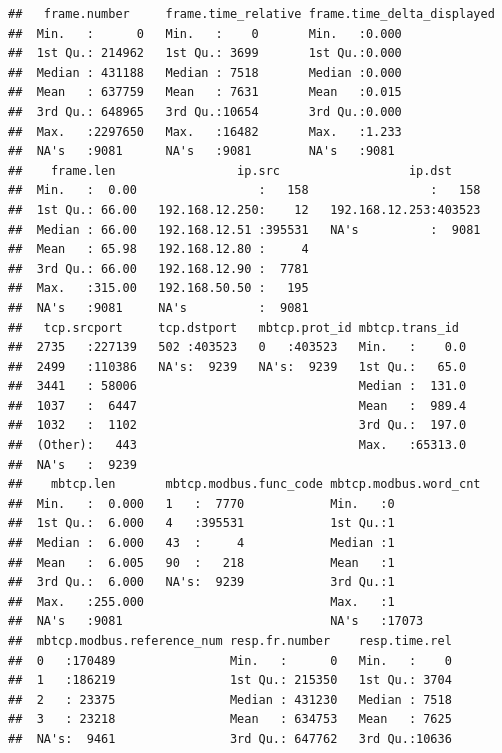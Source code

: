 \documentclass[]{article}
\begin{document}
\begin{verbatim}
##   frame.number     frame.time_relative frame.time_delta_displayed
##  Min.   :      0   Min.   :    0       Min.   :0.000             
##  1st Qu.: 214962   1st Qu.: 3699       1st Qu.:0.000             
##  Median : 431188   Median : 7518       Median :0.000             
##  Mean   : 637759   Mean   : 7631       Mean   :0.015             
##  3rd Qu.: 648965   3rd Qu.:10654       3rd Qu.:0.000             
##  Max.   :2297650   Max.   :16482       Max.   :1.233             
##  NA's   :9081      NA's   :9081        NA's   :9081              
##    frame.len                 ip.src                  ip.dst      
##  Min.   :  0.00                 :   158                 :   158  
##  1st Qu.: 66.00   192.168.12.250:    12   192.168.12.253:403523  
##  Median : 66.00   192.168.12.51 :395531   NA's          :  9081  
##  Mean   : 65.98   192.168.12.80 :     4                          
##  3rd Qu.: 66.00   192.168.12.90 :  7781                          
##  Max.   :315.00   192.168.50.50 :   195                          
##  NA's   :9081     NA's          :  9081                          
##   tcp.srcport     tcp.dstport   mbtcp.prot_id mbtcp.trans_id   
##  2735   :227139   502 :403523   0   :403523   Min.   :    0.0  
##  2499   :110386   NA's:  9239   NA's:  9239   1st Qu.:   65.0  
##  3441   : 58006                               Median :  131.0  
##  1037   :  6447                               Mean   :  989.4  
##  1032   :  1102                               3rd Qu.:  197.0  
##  (Other):   443                               Max.   :65313.0  
##  NA's   :  9239                                                
##    mbtcp.len       mbtcp.modbus.func_code mbtcp.modbus.word_cnt
##  Min.   :  0.000   1   :  7770            Min.   :0            
##  1st Qu.:  6.000   4   :395531            1st Qu.:1            
##  Median :  6.000   43  :     4            Median :1            
##  Mean   :  6.005   90  :   218            Mean   :1            
##  3rd Qu.:  6.000   NA's:  9239            3rd Qu.:1            
##  Max.   :255.000                          Max.   :1            
##  NA's   :9081                             NA's   :17073        
##  mbtcp.modbus.reference_num resp.fr.number    resp.time.rel  
##  0   :170489                Min.   :      0   Min.   :    0  
##  1   :186219                1st Qu.: 215350   1st Qu.: 3704  
##  2   : 23375                Median : 431230   Median : 7518  
##  3   : 23218                Mean   : 634753   Mean   : 7625  
##  NA's:  9461                3rd Qu.: 647762   3rd Qu.:10636  

\end{verbatim}
\end{document}
